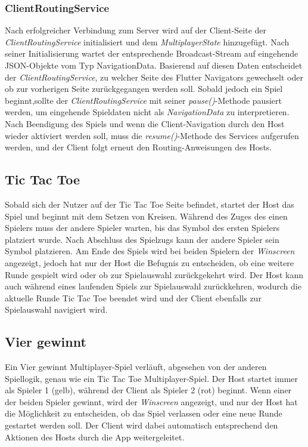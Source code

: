 \subsubsection{ClientRoutingService}
Nach erfolgreicher Verbindung zum Server wird auf der Client-Seite der \textit{ClientRoutingService} initialisiert und dem \textit{MultiplayerState} hinzugefügt. Nach seiner Initialisierung wartet der entsprechende Broadcast-Stream auf eingehende JSON-Objekte vom Typ NavigationData. Basierend auf diesen Daten entscheidet der \textit{ClientRoutingService}, zu welcher Seite des Flutter Navigators gewechselt oder ob zur vorherigen Seite zurückgegangen werden soll.
\newline
\newline
Sobald jedoch ein Spiel beginnt,sollte der \textit{ClientRoutingService} mit seiner \textit{pause()}-Methode pausiert werden, um eingehende Spieldaten nicht als \textit{NavigationData} zu interpretieren. Nach Beendigung des Spiels und wenn die Client-Navigation durch den Host wieder aktiviert werden soll, muss die \textit{resume()}-Methode des Services aufgerufen werden, und der Client folgt erneut den Routing-Anweisungen des Hosts.

\subsection{Tic Tac Toe}
Sobald sich der Nutzer auf der Tic Tac Toe Seite befindet, startet der Host das Spiel und beginnt mit dem Setzen von Kreisen. Während des Zuges des einen Spielers muss der andere Spieler warten, bis das Symbol des ersten Spielers platziert wurde. Nach Abschluss des Spielzugs kann der andere Spieler sein Symbol platzieren.
\newline
Am Ende des Spiels wird bei beiden Spielern der \textit{Winscreen} angezeigt, jedoch hat nur der Host die Befugnis zu entscheiden, ob eine weitere Runde gespielt wird oder ob zur Spielauswahl zurückgekehrt wird. Der Host kann auch während eines laufenden Spiels zur Spielauswahl zurückkehren, wodurch die aktuelle Runde Tic Tac Toe beendet wird und der Client ebenfalls zur Spielauswahl navigiert wird.

\subsection{Vier gewinnt}
Ein Vier gewinnt Multiplayer-Spiel verläuft, abgesehen von der anderen Spiellogik, genau wie ein Tic Tac Toe Multiplayer-Spiel. Der Host startet immer als Spieler 1 (gelb), während der Client als Spieler 2 (rot) beginnt. Wenn einer der beiden Spieler gewinnt, wird der \textit{Winscreen} angezeigt, und nur der Host hat die Möglichkeit zu entscheiden, ob das Spiel verlassen oder eine neue Runde gestartet werden soll. Der Client wird dabei automatisch entsprechend den Aktionen des Hosts durch die App weitergeleitet.  
